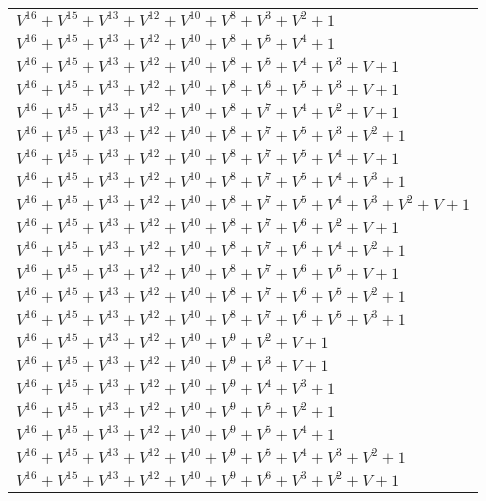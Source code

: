 \documentclass[12pt]{article}
\begin{document}
\begin{adjustwidth}{-4cm}{}
\begin{center}
\begin{longtable}{|l|}
$V^{16}  +V^{15}  +V^{13}  +V^{12}  +V^{10}  +V^{8}  +V^{3}  +V^{2}  + 1$ \\
$V^{16}  +V^{15}  +V^{13}  +V^{12}  +V^{10}  +V^{8}  +V^{5}  +V^{4}  + 1$ \\
$V^{16}  +V^{15}  +V^{13}  +V^{12}  +V^{10}  +V^{8}  +V^{5}  +V^{4}  +V^{3}  + V + 1$ \\
$V^{16}  +V^{15}  +V^{13}  +V^{12}  +V^{10}  +V^{8}  +V^{6}  +V^{5}  +V^{3}  + V + 1$ \\
$V^{16}  +V^{15}  +V^{13}  +V^{12}  +V^{10}  +V^{8}  +V^{7}  +V^{4}  +V^{2}  + V + 1$ \\
$V^{16}  +V^{15}  +V^{13}  +V^{12}  +V^{10}  +V^{8}  +V^{7}  +V^{5}  +V^{3}  +V^{2}  + 1$ \\
$V^{16}  +V^{15}  +V^{13}  +V^{12}  +V^{10}  +V^{8}  +V^{7}  +V^{5}  +V^{4}  + V + 1$ \\
$V^{16}  +V^{15}  +V^{13}  +V^{12}  +V^{10}  +V^{8}  +V^{7}  +V^{5}  +V^{4}  +V^{3}  + 1$ \\
$V^{16}  +V^{15}  +V^{13}  +V^{12}  +V^{10}  +V^{8}  +V^{7}  +V^{5}  +V^{4}  +V^{3}  +V^{2}  + V + 1$ \\
$V^{16}  +V^{15}  +V^{13}  +V^{12}  +V^{10}  +V^{8}  +V^{7}  +V^{6}  +V^{2}  + V + 1$ \\
$V^{16}  +V^{15}  +V^{13}  +V^{12}  +V^{10}  +V^{8}  +V^{7}  +V^{6}  +V^{4}  +V^{2}  + 1$ \\
$V^{16}  +V^{15}  +V^{13}  +V^{12}  +V^{10}  +V^{8}  +V^{7}  +V^{6}  +V^{5}  + V + 1$ \\
$V^{16}  +V^{15}  +V^{13}  +V^{12}  +V^{10}  +V^{8}  +V^{7}  +V^{6}  +V^{5}  +V^{2}  + 1$ \\
$V^{16}  +V^{15}  +V^{13}  +V^{12}  +V^{10}  +V^{8}  +V^{7}  +V^{6}  +V^{5}  +V^{3}  + 1$ \\
$V^{16}  +V^{15}  +V^{13}  +V^{12}  +V^{10}  +V^{9}  +V^{2}  + V + 1$ \\
$V^{16}  +V^{15}  +V^{13}  +V^{12}  +V^{10}  +V^{9}  +V^{3}  + V + 1$ \\
$V^{16}  +V^{15}  +V^{13}  +V^{12}  +V^{10}  +V^{9}  +V^{4}  +V^{3}  + 1$ \\
$V^{16}  +V^{15}  +V^{13}  +V^{12}  +V^{10}  +V^{9}  +V^{5}  +V^{2}  + 1$ \\
$V^{16}  +V^{15}  +V^{13}  +V^{12}  +V^{10}  +V^{9}  +V^{5}  +V^{4}  + 1$ \\
$V^{16}  +V^{15}  +V^{13}  +V^{12}  +V^{10}  +V^{9}  +V^{5}  +V^{4}  +V^{3}  +V^{2}  + 1$ \\
$V^{16}  +V^{15}  +V^{13}  +V^{12}  +V^{10}  +V^{9}  +V^{6}  +V^{3}  +V^{2}  + V + 1$ \\

\end{longtable}
\end{center}
\end{adjustwidth}
\end{document}
